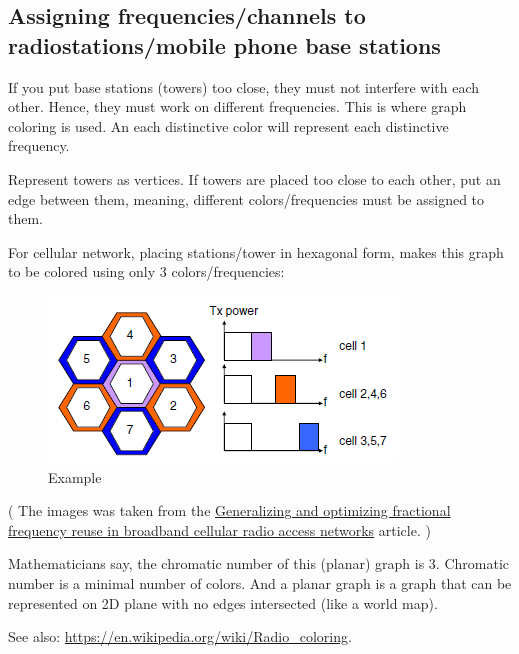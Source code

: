 \subsection{Assigning frequencies/channels to radiostations/mobile phone base stations}

If you put base stations (towers) too close, they must not interfere with each other.
Hence, they must work on different frequencies.
This is where graph coloring is used.
An each distinctive color will represent each distinctive frequency.

Represent towers as vertices.
If towers are placed too close to each other, put an edge between them, meaning, different colors/frequencies must be assigned to them.

For cellular network, placing stations/tower in hexagonal form, makes this graph to be colored using only 3 colors/frequencies:

\begin{figure}[H]
\centering
\includegraphics[scale=0.85]{color/freq.png}
\caption{Example}
\end{figure}

( The images was taken from the 
\href{https://jwcn-eurasipjournals.springeropen.com/articles/10.1186/1687-1499-2012-230}{Generalizing and optimizing fractional frequency reuse in broadband cellular radio access networks} article. )

Mathematicians say, the chromatic number of this (planar) graph is 3.
Chromatic number is a minimal number of colors.
And a planar graph is a graph that can be represented on 2D plane with no edges intersected (like a world map).

See also: \url{https://en.wikipedia.org/wiki/Radio_coloring}.

